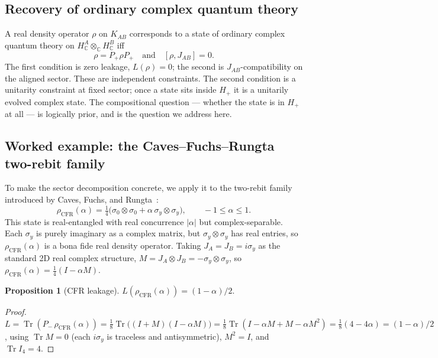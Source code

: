 \documentclass[a4paper,onecolumn,noarxiv]{quantumarticle}
\theoremstyle{plain}
\newtheorem{proposition}[theorem]{Proposition}
\theoremstyle{definition}
\theoremstyle{remark}
\newcommand{\C}{\mathbb{C}}
\newcommand{\HC}{H_{\C}}
\newcommand{\KAB}{K_{AB}}
\newcommand{\Pplus}{P_{+}}
\newcommand{\Pminus}{P_{-}}
\newcommand{\Hplus}{H_{+}}
\newcommand{\Mop}{M}
\newcommand{\JAB}{J_{AB}}
\newcommand{\Tr}{\operatorname{Tr}}
\newcommand{\Lleak}{L}
\begin{document}
\subsection{Recovery of ordinary complex quantum theory}
\label{ssec:recovery}

A real density operator $\rho$ on $\KAB$ corresponds to a state of ordinary complex
quantum theory on $\HC^A\otimes_\C\HC^B$ iff
\begin{equation}
  \rho = \Pplus\rho\Pplus \quad\text{and}\quad [\rho,\JAB]=0.
\end{equation}
The first condition is zero leakage, $\Lleak(\rho)=0$; the second is
$\JAB$-compatibility on the aligned sector. These are independent constraints. The
second condition is a unitarity constraint at fixed sector; once a state sits inside
$\Hplus$ it is a unitarily evolved complex state. The compositional question ---
whether the state is in $\Hplus$ at all --- is logically prior, and is the question
we address here.

\subsection{Worked example: the Caves--Fuchs--Rungta two-rebit family}
\label{sec:cfr}

To make the sector decomposition concrete, we apply it to the two-rebit family
introduced by Caves, Fuchs, and Rungta~\cite{CavesFuchsRungta2001}:
\begin{equation}
  \rho_{\mathrm{CFR}}(\alpha) = \tfrac{1}{4}\bigl(\sigma_0\otimes\sigma_0
  + \alpha\,\sigma_y\otimes\sigma_y\bigr), \qquad -1\le\alpha\le 1.
  \label{eq:cfr-state}
\end{equation}
This state is real-entangled with real concurrence $|\alpha|$ but complex-separable.
Each $\sigma_y$ is purely imaginary as a complex matrix, but $\sigma_y\otimes\sigma_y$
has real entries, so $\rho_{\mathrm{CFR}}(\alpha)$ is a bona fide real density
operator. Taking $J_A=J_B=i\sigma_y$ as the standard 2D real complex structure,
$\Mop=J_A\otimes J_B=-\sigma_y\otimes\sigma_y$, so
$\rho_{\mathrm{CFR}}(\alpha)=\tfrac{1}{4}(I-\alpha\Mop)$.

\begin{proposition}[CFR leakage]
\label{prop:cfr}
$\Lleak(\rho_{\mathrm{CFR}}(\alpha)) = (1-\alpha)/2.$
\end{proposition}

\begin{proof}
$\Lleak = \Tr(\Pminus\,\rho_{\mathrm{CFR}}(\alpha)) = \tfrac{1}{8}\Tr\bigl((I+\Mop)
(I-\alpha\Mop)\bigr) = \tfrac{1}{8}\Tr(I - \alpha\Mop + \Mop - \alpha\Mop^2)
= \tfrac{1}{8}(4-4\alpha) = (1-\alpha)/2$,
using $\Tr\Mop=0$ (each $i\sigma_y$ is traceless and antisymmetric), $\Mop^2=I$,
and $\Tr I_4=4$.
\end{proof}
\end{document}
